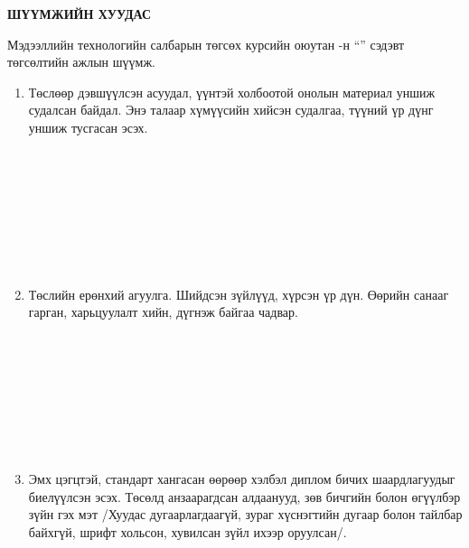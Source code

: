 \begin{titlepage}
    \begin{center}
        {\scshape\LARGE \univname\par}
        {\scshape\Large \facname\par}\vspace{1cm}    
    {\large\textbf{ШҮҮМЖИЙН ХУУДАС}}
    \end{center}
    
    \vspace{0.3cm}
    \noindent Мэдээллийн технологийн салбарын төгсөх курсийн оюутан \shortname-н ``\ttitle'' сэдэвт төгсөлтийн ажлын шүүмж.
    
    \begin{enumerate}
    
    \item Төслөөр дэвшүүлсэн асуудал, үүнтэй холбоотой онолын материал уншиж судалсан байдал. Энэ талаар хүмүүсийн хийсэн судалгаа, түүний үр дүнг уншиж тусгасан эсэх.
    \begin{center}
    \dotfill \\[0.1cm] \dotfill \\[0.1cm] \dotfill \\[0.1cm]
    \dotfill \\[0.1cm] \dotfill \\[0.1cm] \dotfill \\[0.1cm]
    \dotfill \\[0.4cm]
    \end{center}
    
    \item Төслийн ерөнхий агуулга. Шийдсэн зүйлүүд, хүрсэн үр дүн. Өөрийн санааг гарган, харьцуулалт хийн, дүгнэж байгаа чадвар.
    \begin{center}
    \dotfill \\[0.1cm] \dotfill \\[0.1cm] \dotfill \\[0.1cm]
    \dotfill \\[0.1cm] \dotfill \\[0.1cm] \dotfill \\[0.1cm]
    \dotfill \\[0.4cm]
    \end{center}
    
    \item Эмх цэгцтэй, стандарт хангасан өөрөөр хэлбэл диплом бичих шаардлагуудыг биелүүлсэн эсэх. Төсөлд анзаарагдсан алдаанууд, зөв бичгийн болон өгүүлбэр зүйн гэх мэт /Хуудас дугаарлагдаагүй, зураг хүснэгтийн дугаар болон тайлбар байхгүй, шрифт хольсон, хувилсан зүйл ихээр оруулсан/.
    \begin{center}
    \dotfill \\[0.1cm] \dotfill \\[0.1cm] \dotfill \\[0.1cm]
    \dotfill \\[0.1cm] \dotfill \\[0.1cm] \dotfill \\[0.1cm]
    \dotfill \\[0.4cm]
    \end{center}
    

\end{enumerate}
\end{titlepage}
